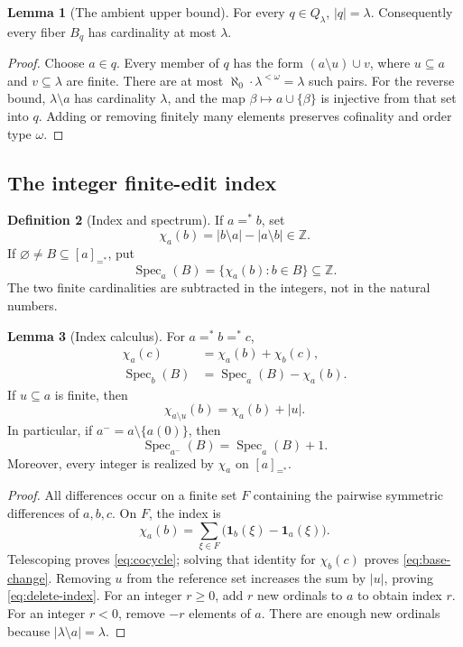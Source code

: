 \documentclass[11pt,letterpaper]{article}
\theoremstyle{definition}
\newtheorem{definition}{Definition}[section]
\newtheorem{lemma}[definition]{Lemma}
\numberwithin{equation}{section}
\newcommand{\ZZ}{\mathbb Z}
\newcommand{\ch}{\chi}
\newcommand{\Spec}{\operatorname{Spec}}
\newcommand{\eqfin}{\mathrel{=^{*}}}
\newcommand{\eqq}[1]{[#1]_{=^{*}}}
\begin{document}
\begin{lemma}[The ambient upper bound]\label{lem:class-size}
For every $q\in Q_\lambda$, $|q|=\lambda$. Consequently every fiber $B_q$ has cardinality at most $\lambda$.
\end{lemma}
\begin{proof}
Choose $a\in q$. Every member of $q$ has the form $(a\setminus u)\cup v$, where $u\subseteq a$ and $v\subseteq\lambda$ are finite. There are at most $\aleph_0\cdot\lambda^{<\omega}=\lambda$ such pairs. For the reverse bound, $\lambda\setminus a$ has cardinality $\lambda$, and the map $\beta\mapsto a\cup\{\beta\}$ is injective from that set into $q$. Adding or removing finitely many elements preserves cofinality and order type $\omega$.
\end{proof}

\subsection{The integer finite-edit index}

\begin{definition}[Index and spectrum]\label{def:index}
If $a\eqfin b$, set
\[
\ch_a(b)=|b\setminus a|-|a\setminus b|\in\ZZ.
\]
If $\varnothing\ne B\subseteq\eqq a$, put
\[
\Spec_a(B)=\{\ch_a(b):b\in B\}\subseteq\ZZ.
\]
The two finite cardinalities are subtracted in the integers, not in the natural numbers.
\end{definition}

\begin{lemma}[Index calculus]\label{lem:index}
For $a\eqfin b\eqfin c$,
\begin{align}
\ch_a(c)&=\ch_a(b)+\ch_b(c),\label{eq:cocycle}\\
\Spec_b(B)&=\Spec_a(B)-\ch_a(b).\label{eq:base-change}
\end{align}
If $u\subseteq a$ is finite, then
\begin{equation}
\ch_{a\setminus u}(b)=\ch_a(b)+|u|.\label{eq:delete-index}
\end{equation}
In particular, if $a^-=a\setminus\{a(0)\}$, then
\begin{equation}
\Spec_{a^-}(B)=\Spec_a(B)+1.\label{eq:tail-index}
\end{equation}
Moreover, every integer is realized by $\ch_a$ on $\eqq a$.
\end{lemma}
\begin{proof}
All differences occur on a finite set $F$ containing the pairwise symmetric differences of $a,b,c$. On $F$, the index is
\[
\ch_a(b)=\sum_{\xi\in F}\bigl(\mathbf1_b(\xi)-\mathbf1_a(\xi)\bigr).
\]
Telescoping proves \eqref{eq:cocycle}; solving that identity for $\ch_b(c)$ proves \eqref{eq:base-change}. Removing $u$ from the reference set increases the sum by $|u|$, proving \eqref{eq:delete-index}. For an integer $r\ge0$, add $r$ new ordinals to $a$ to obtain index $r$. For an integer $r<0$, remove $-r$ elements of $a$. There are enough new ordinals because $|\lambda\setminus a|=\lambda$.
\end{proof}
\end{document}
